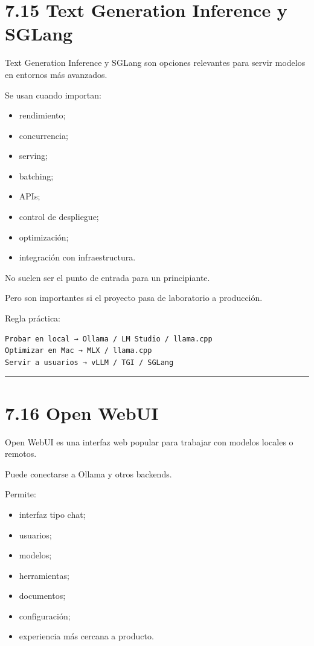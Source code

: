 \section{7.15 Text Generation Inference y
SGLang}\label{text-generation-inference-y-sglang}

Text Generation Inference y SGLang son opciones relevantes para servir
modelos en entornos más avanzados.

Se usan cuando importan:

\begin{itemize}
\tightlist
\item
  rendimiento;
\item
  concurrencia;
\item
  serving;
\item
  batching;
\item
  APIs;
\item
  control de despliegue;
\item
  optimización;
\item
  integración con infraestructura.
\end{itemize}

No suelen ser el punto de entrada para un principiante.

Pero son importantes si el proyecto pasa de laboratorio a producción.

Regla práctica:

\begin{lstlisting}
Probar en local → Ollama / LM Studio / llama.cpp
Optimizar en Mac → MLX / llama.cpp
Servir a usuarios → vLLM / TGI / SGLang
\end{lstlisting}

\begin{center}\rule{0.5\linewidth}{0.5pt}\end{center}

\section{7.16 Open WebUI}\label{open-webui}

Open WebUI es una interfaz web popular para trabajar con modelos locales
o remotos.

Puede conectarse a Ollama y otros backends.

Permite:

\begin{itemize}
\tightlist
\item
  interfaz tipo chat;
\item
  usuarios;
\item
  modelos;
\item
  herramientas;
\item
  documentos;
\item
  configuración;
\item
  experiencia más cercana a producto.
\end{itemize}

